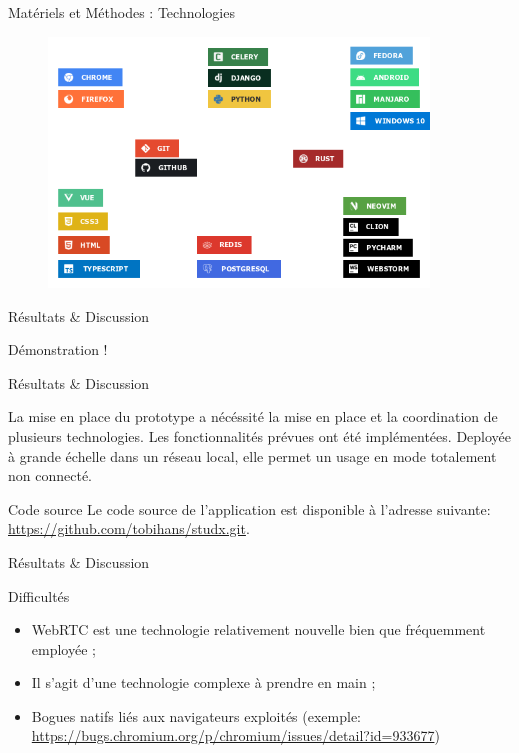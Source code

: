 \documentclass{beamer}
\begin{document}
\begin{frame}{Matériels et Méthodes : \small{Technologies}}
  \begin{figure}[H]
    \centering
    \includegraphics[width=0.9\textwidth]{tools}
\end{figure}
\end{frame}


\begin{frame}{Résultats \& Discussion}
  \begin{center}
    \Huge{Démonstration !}
  \end{center}
\end{frame}

\begin{frame}{Résultats \& Discussion}
  \begin{block}{}
    La mise en place du prototype a nécéssité la mise en place et la coordination de plusieurs technologies.
    Les fonctionnalités prévues ont été implémentées. Deployée à grande échelle dans un réseau local, elle permet un usage en mode totalement non connecté.
  \end{block}

  \begin{block}{Code source}
    Le code source de l'application est disponible à l'adresse suivante:
    \url{https://github.com/tobihans/studx.git}.
  \end{block}
\end{frame}

\begin{frame}{Résultats \& Discussion}
  \begin{block}{Difficultés}
    \begin{itemize}
      \item WebRTC est une technologie relativement nouvelle bien que fréquemment employée ;
      \item Il s'agit d'une technologie complexe à prendre en main ;
      \item Bogues natifs liés aux navigateurs exploités (exemple: \url{https://bugs.chromium.org/p/chromium/issues/detail?id=933677})
    \end{itemize}
  \end{block}
\end{frame}
\end{document}
